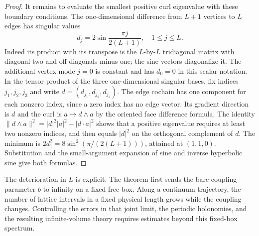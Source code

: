 \begin{proof}
It remains to evaluate the smallest positive curl eigenvalue with these
boundary conditions. The one-dimensional difference from \(L+1\) vertices
to \(L\) edges has singular values
\[
 d_j=2\sin\frac{\pi j}{2(L+1)},\quad 1\le j\le L .
\]
Indeed its product with its transpose is the \(L\)-by-\(L\) tridiagonal
matrix with diagonal two and off-diagonals minus one; the sine vectors
diagonalize it. The additional vertex mode \(j=0\) is constant and has
\(d_0=0\) in this scalar notation. In the tensor product of the three
one-dimensional singular bases, fix indices \(j_1,j_2,j_3\) and write
\(d=(d_{j_1},d_{j_2},d_{j_3})\). The edge cochain has one component
for each nonzero index, since a zero index has no edge vector.
Its gradient direction is \(d\) and the curl is \(a\mapsto d\wedge a\)
by the oriented face difference formula. The identity
\(\|d\wedge a\|^2=|d|^2|a|^2-|d\cdot a|^2\) shows that a positive
eigenvalue requires at least two nonzero indices, and then equals
\(|d|^2\) on the orthogonal complement of \(d\). The minimum is
\(2d_1^2=8\sin^2(\pi/(2(L+1)))\), attained at \((1,1,0)\).
Substitution and the small-argument expansion of sine and inverse
hyperbolic sine give both formulas.
\end{proof}

The deterioration in \(L\) is explicit. The theorem first sends the bare
coupling parameter \(b\) to infinity on a fixed free box. Along a continuum
trajectory, the number of lattice intervals in a fixed physical length
grows while the coupling changes. Controlling the errors in that joint
limit, the periodic holonomies, and the resulting infinite-volume theory
requires estimates beyond this fixed-box spectrum.

